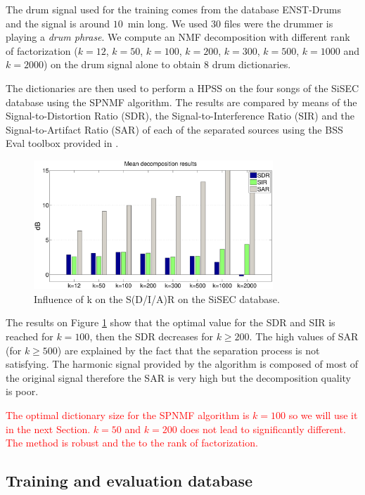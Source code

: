 \documentclass{article}
\begin{document}
The drum signal used for the training comes from the database ENST-Drums \cite{gillet2006enst} and the signal is around $10$~min long. We used $30$ files were the drummer is playing a \emph{drum phrase}. We compute an NMF decomposition with different rank of factorization ($k=12$, $k=50$, $k=100$, $k=200$, $k=300$, $k=500$, $k=1000$ and $k=2000$) on the drum signal alone to obtain $8$ drum dictionaries.

The dictionaries are then used to perform a HPSS on the four songs of the SiSEC database using the SPNMF algorithm. The results are compared by means of the Signal-to-Distortion Ratio (SDR), the Signal-to-Interference Ratio (SIR) and the Signal-to-Artifact Ratio (SAR) of each of the separated sources using the BSS Eval toolbox provided in \cite{bsseval}.

\begin{figure}[h]

  \centering 
  \includegraphics[width=9cm]{figs/AllDictSizeISMIR.eps}
  \caption{\label{dictsize}Influence of k on the S(D/I/A)R on the SiSEC database.}
  
\end{figure}

The results on Figure \ref{dictsize} show that the optimal value for the SDR and SIR is reached for $k=100$, then the SDR decreases for $k\geqslant 200$. The high values of SAR (for $k\geqslant 500$) are explained by the fact that the separation process is not satisfying. The harmonic signal provided by the algorithm is composed of most of the original signal therefore the SAR is very high but the decomposition quality is poor. 

\textcolor{red}{The optimal dictionary size for the SPNMF algorithm is $k=100$ so we will use it in the next Section. $k=50$ and $k=200$ does not lead to significantly different. The method is robust and the to the rank of factorization.}

\subsection{Training and evaluation database}\label{database}
\end{document}
